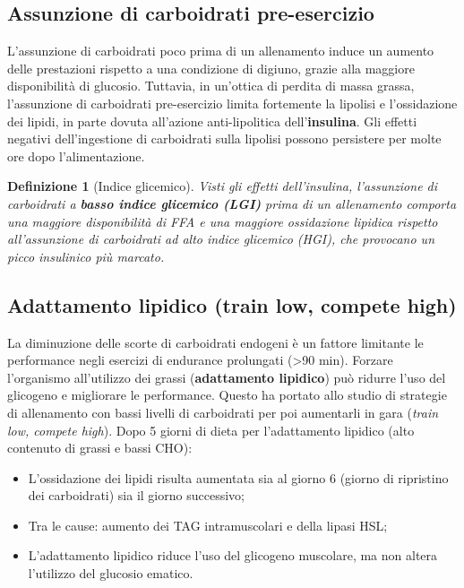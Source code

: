 \documentclass[12pt,a4paper]{report}
\newtheorem{definizione}{Definizione}[section]
\begin{document}
\subsection{Assunzione di carboidrati pre-esercizio}
L'assunzione di carboidrati poco prima di un allenamento induce un aumento delle prestazioni rispetto a una condizione di digiuno, grazie alla maggiore disponibilità di glucosio.
Tuttavia, in un'ottica di perdita di massa grassa, l'assunzione di carboidrati pre-esercizio limita fortemente la lipolisi e l'ossidazione dei lipidi, in parte dovuta all'azione anti-lipolitica dell'\textbf{insulina}. Gli effetti negativi dell'ingestione di carboidrati sulla lipolisi possono persistere per molte ore dopo l'alimentazione.
\begin{definizione}[Indice glicemico]
Visti gli effetti dell'insulina, l'assunzione di carboidrati a \textbf{basso indice glicemico (LGI)} prima di un allenamento comporta una maggiore disponibilità di FFA e una maggiore ossidazione lipidica rispetto all'assunzione di carboidrati ad alto indice glicemico (HGI), che provocano un picco insulinico più marcato.
\end{definizione}
\subsection{Adattamento lipidico (train low, compete high)}
La diminuzione delle scorte di carboidrati endogeni è un fattore limitante le performance negli esercizi di endurance prolungati (>90 min). Forzare l'organismo all'utilizzo dei grassi (\textbf{adattamento lipidico}) può ridurre l'uso del glicogeno e migliorare le performance.
Questo ha portato allo studio di strategie di allenamento con bassi livelli di carboidrati per poi aumentarli in gara (\textit{train low, compete high}).
Dopo 5 giorni di dieta per l'adattamento lipidico (alto contenuto di grassi e bassi CHO):
\begin{itemize}
\item L'ossidazione dei lipidi risulta aumentata sia al giorno 6 (giorno di ripristino dei carboidrati) sia il giorno successivo;
\item Tra le cause: aumento dei TAG intramuscolari e della lipasi HSL;
\item L'adattamento lipidico riduce l'uso del glicogeno muscolare, ma non altera l'utilizzo del glucosio ematico.
\end{itemize}
\end{document}
